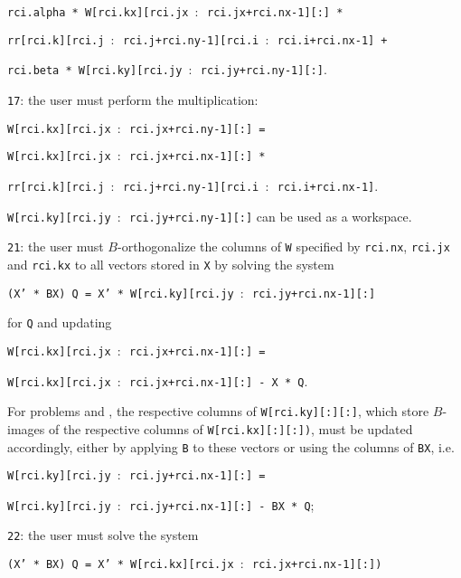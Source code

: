 \begin{description}
\begin{description}
\hspace{12mm}
{\tt rci.alpha *
W[rci.kx][rci.jx $:$ rci.jx+rci.nx-1][:] *}

\hspace{16mm}
{\tt rr[rci.k][rci.j $:$ rci.j+rci.ny-1][rci.i $:$ rci.i+rci.nx-1] + }

\hspace{12mm}
{\tt rci.beta * W[rci.ky][rci.jy $:$ rci.jy+rci.ny-1][:]}.
%
\item
{\tt 17}: the user must perform the multiplication:


\hspace{8mm}
{\tt W[rci.kx][rci.jx $:$ rci.jx+rci.ny-1][:] =}

\hspace{12mm}
{\tt W[rci.kx][rci.jx $:$ rci.jx+rci.nx-1][:] *}

\hspace{16mm}
{\tt rr[rci.k][rci.j $:$ rci.j+rci.ny-1][rci.i $:$ rci.i+rci.nx-1]}.

{\tt W[rci.ky][rci.jy $:$ rci.jy+rci.ny-1][:]}
can be used as a workspace.
%
\item
{\tt 21}: 
the user must $B$-orthogonalize
the columns of {\tt W} specified by
{\tt rci.nx}, {\tt rci.jx} and {\tt rci.kx} 
to all vectors stored in {\tt X}
by solving the system

\hspace{8mm}
{\tt (X' * BX) Q = X' * W[rci.ky][rci.jy $:$ rci.jy+rci.nx-1][:]}

for {\tt Q} and updating

\hspace{8mm}
{\tt W[rci.kx][rci.jx $:$ rci.jx+rci.nx-1][:] =}

\hspace{12mm}
{\tt W[rci.kx][rci.jx $:$ rci.jx+rci.nx-1][:] - X * Q}.

For problems  and ,
the respective columns of {\tt W[rci.ky][:][:]},
which store $B$-images of the respective columns of {\tt W[rci.kx][:][:])},
must be updated
accordingly, either by applying {\tt B} to these vectors
or using the columns of {\tt BX}, i.e.

\hspace{8mm}
{\tt W[rci.ky][rci.jy $:$ rci.jy+rci.nx-1][:] =}

\hspace{12mm}
{\tt W[rci.ky][rci.jy $:$ rci.jy+rci.nx-1][:] - BX * Q};
%
\item
{\tt 22}: 
the user must solve the system

\hspace{8mm}
{\tt (X' * BX) Q = 
X' * W[rci.kx][rci.jx $:$ rci.jx+rci.nx-1][:])}


\end{description}
\end{description}
